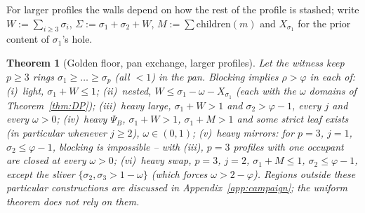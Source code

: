 \documentclass[11pt]{article}
\newtheorem{theorem}{Theorem}
\theoremstyle{definition}
\begin{document}
For larger profiles the walls depend on how the rest of the profile is
stashed; write $W:=\sum_{i\ge3}\sigma_i$, $\Sigma:=\sigma_1+\sigma_2+W$,
$M:=\sum\mathrm{children}(m)$ and $X_{\sigma_1}$ for the prior content
of $\sigma_1$'s hole.

\begin{theorem}[Golden floor, pan exchange, larger profiles]\label{thm:DPp}
Let the witness keep $p\ge3$ rings $\sigma_1\ge\dots\ge\sigma_p$
(all $<1$) in the pan. Blocking implies $\rho>\varphi$ in each of:
(i)~\emph{light}, $\sigma_1+W\le1$; (ii)~\emph{nested},
$W\le\sigma_1-\omega-X_{\sigma_1}$ (each with the $\omega$ domains of
Theorem~\ref{thm:DP}); (iii)~\emph{heavy large}, $\sigma_1+W>1$ and
$\sigma_2>\varphi-1$, every $j$ and every $\omega>0$;
(iv)~\emph{heavy $\Psi_B$}, $\sigma_1+W>1$, $\sigma_1+M>1$ and some
strict leaf exists (in particular whenever $j\ge2$), $\omega\in(0,1)$;
(v)~\emph{heavy mirrors}: for $p=3$, $j=1$, $\sigma_2\le\varphi-1$,
blocking is \emph{impossible} -- with (iii), $p=3$ profiles with one
occupant are closed at every $\omega>0$; (vi)~\emph{heavy swap}, $p=3$,
$j=2$, $\sigma_1+M\le1$, $\sigma_2\le\varphi-1$, except the sliver
$\{\sigma_2,\sigma_3>1-\omega\}$ (which forces $\omega>2-\varphi$).
Regions outside these particular constructions are discussed in
Appendix~\ref{app:campaign}; the uniform theorem does not rely on them.
\end{theorem}
\end{document}
